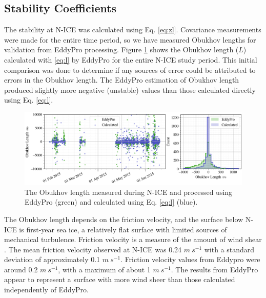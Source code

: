 \subsection{Stability Coefficients}
The stability at N-ICE was calculated using Eq. \ref{eq:zl}. Covariance measurements were made for the entire time period, so we have measured Obukhov lengths for validation from EddyPro processing. Figure \ref{fig:ol} shows the Obukhov length ($L$) calculated with \ref{eq:l} by EddyPro for the entire N-ICE study period. This initial comparison was done to determine if any sources of error could be attributed to errors in the Obukhov length. The EddyPro estimation of Obukhov length produced slightly more negative (unstable) values than those calculated directly using Eq. \ref{eq:l}. 

\begin{figure}[b!]
    \centering
    \includegraphics[width=1\linewidth]{figures/chapter5/ch3_obukhovlength.png}
    \caption[Obukhov length]{The Obukhov length measured during N-ICE and processed using EddyPro (green) and calculated using Eq. \ref{eq:l} (blue).}
    \label{fig:ol}
\end{figure}

The Obukhov length depends on the friction velocity, and the surface below N-ICE is first-year sea ice, a relatively flat surface with limited sources of mechanical turbulence. Friction velocity is a measure of the amount of wind shear \citep{stull:1988}. The mean friction velocity observed at N-ICE was 0.24 $m~s^{-1}$ with a standard deviation of approximately 0.1 $m~s^{-1}$. Friction velocity values from Eddypro were around 0.2 $m~s^{-1}$, with a maximum of about 1 $m~s^{-1}$. The results from EddyPro appear to represent a surface with more wind sheer than those calculated independently of EddyPro. 

